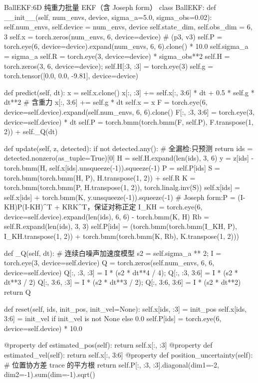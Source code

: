 \begin{codebox}[Python]{BallEKF:6D 纯重力批量 EKF（含 Joseph form）}
class BallEKF:
    def __init__(self, num_envs, device, sigma_a=5.0, sigma_obs=0.02):
        self.num_envs, self.device = num_envs, device
        self.state_dim, self.obs_dim = 6, 3
        self.x = torch.zeros(num_envs, 6, device=device)              # (p3, v3)
        self.P = torch.eye(6, device=device).expand(num_envs, 6, 6).clone() * 10.0
        self.sigma_a = sigma_a
        self.R = torch.eye(3, device=device) * sigma_obs**2
        self.H = torch.zeros(3, 6, device=device); self.H[:3, :3] = torch.eye(3)
        self.g = torch.tensor([0.0, 0.0, -9.81], device=device)

    def predict(self, dt):
        x = self.x.clone()
        x[:, :3] += self.x[:, 3:6] * dt + 0.5 * self.g * dt**2        # 含重力
        x[:, 3:6] += self.g * dt
        self.x = x
        F = torch.eye(6, device=self.device).expand(self.num_envs, 6, 6).clone()
        F[:, :3, 3:6] = torch.eye(3, device=self.device) * dt
        self.P = torch.bmm(torch.bmm(F, self.P), F.transpose(1, 2)) + self._Q(dt)

    def update(self, z, detected):
        if not detected.any():                                       # 全漏检:只预测
            return
        ids = detected.nonzero(as_tuple=True)[0]
        H = self.H.expand(len(ids), 3, 6)
        y = z[ids] - torch.bmm(H, self.x[ids].unsqueeze(-1)).squeeze(-1)
        P = self.P[ids]
        S = torch.bmm(torch.bmm(H, P), H.transpose(1, 2)) + self.R
        K = torch.bmm(torch.bmm(P, H.transpose(1, 2)), torch.linalg.inv(S))
        self.x[ids] = self.x[ids] + torch.bmm(K, y.unsqueeze(-1)).squeeze(-1)
        # Joseph form:P = (I-KH)P(I-KH)^T + KRK^T，保证对称正定
        I_KH = torch.eye(6, device=self.device).expand(len(ids), 6, 6) - torch.bmm(K, H)
        Rb = self.R.expand(len(ids), 3, 3)
        self.P[ids] = (torch.bmm(torch.bmm(I_KH, P), I_KH.transpose(1, 2))
                       + torch.bmm(torch.bmm(K, Rb), K.transpose(1, 2)))

    def _Q(self, dt):       # 连续白噪声加速度模型
        s2 = self.sigma_a ** 2; I = torch.eye(3, device=self.device)
        Q = torch.zeros(self.num_envs, 6, 6, device=self.device)
        Q[:, :3, :3] = I * (s2 * dt**4 / 4); Q[:, :3, 3:6] = I * (s2 * dt**3 / 2)
        Q[:, 3:6, :3] = I * (s2 * dt**3 / 2); Q[:, 3:6, 3:6] = I * (s2 * dt**2)
        return Q

    def reset(self, ids, init_pos, init_vel=None):
        self.x[ids, :3] = init_pos
        self.x[ids, 3:6] = init_vel if init_vel is not None else 0.0
        self.P[ids] = torch.eye(6, device=self.device) * 10.0

    @property
    def estimated_pos(self): return self.x[:, :3]
    @property
    def estimated_vel(self): return self.x[:, 3:6]
    @property
    def position_uncertainty(self):     # 位置协方差 trace 的平方根
        return self.P[:, :3, :3].diagonal(dim1=-2, dim2=-1).sum(dim=-1).sqrt()
\end{codebox}

